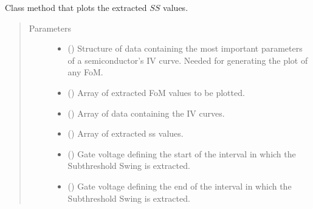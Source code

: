 \documentclass[letterpaper,10pt,english,openany, oneside]{sphinxmanual}
\begin{document}
\begin{fulllineitems}
\begin{fulllineitems}
\begin{quote}
\begin{description}
\end{description}\end{quote}

\end{fulllineitems}


\begin{fulllineitems}
\label{\detokenize{index:fompy.fom.ss_ext.plot}}
Class method that plots the extracted \(SS\) values.
\begin{quote}\begin{description}
\item[{Parameters}] \leavevmode\begin{itemize}
\item {} 
 () \textendash{} Structure of data containing the most important parameters of a semiconductor’s IV curve.
Needed for generating the plot of any FoM.

\item {} 
 () \textendash{} Array of extracted FoM values to be plotted.

\item {} 
 () \textendash{} Array of data containing the IV curves.

\item {} 
 () \textendash{} Array of extracted ss values.

\item {} 
 () \textendash{} Gate voltage defining the start of the interval in which the Subthreshold Swing is extracted.

\item {} 
 () \textendash{} Gate voltage defining the end of the interval in which the Subthreshold Swing is extracted.


\end{itemize}
\end{description}
\end{quote}
\end{fulllineitems}
\end{fulllineitems}
\end{document}
